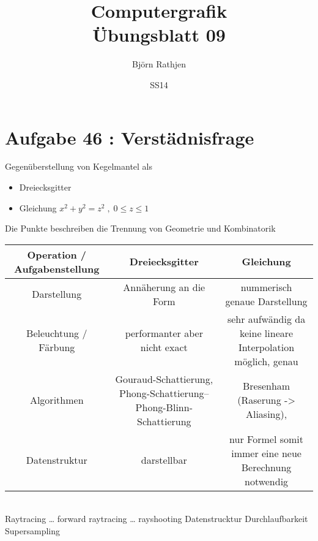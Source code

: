 \documentclass[11pt]{article}
\title{Computergrafik\\Übungsblatt 09}
\author{Björn Rathjen}
\date{SS14}
\begin{document}
\maketitle
\newpage
\section{Aufgabe 46 : Verstädnisfrage}
Gegenüberstellung von Kegelmantel als
\begin{itemize}
\item Dreiecksgitter
\item Gleichung $x^2 + y^2 = z^2 \; , \; 0\leq z \leq 1$ 
\end{itemize}
Die Punkte beschreiben die Trennung von Geometrie und Kombinatorik\\

\begin{tabular}{c|c|c}
Operation / Aufgabenstellung &
Dreiecksgitter &
Gleichung \\ \hline
 
Darstellung & 
Annäherung an die Form &
nummerisch genaue Darstellung \\ \hline 

Beleuchtung / Färbung & 
\begin{minipage}[c]{5cm} performanter aber nicht exact \end{minipage} &
\begin{minipage}[c]{5cm} sehr aufwändig da keine lineare Interpolation möglich, genau \end{minipage} \hspace{0.3cm}\\ \hline  

Algorithmen &
\hspace{0.3cm }\begin{minipage}[c]{5cm} Gouraud-Schattierung, Phong-Schattierung– Phong-Blinn-Schattierung \end{minipage}& 
Bresenham (Raserung -> Aliasing),\\ \hline \hspace{0.3cm}

Datenstruktur &
darstellbar &
nur Formel somit immer eine neue Berechnung notwendig \\

\end{tabular}\\
Raytracing … forward raytracing … rayshooting 
Datenstrucktur Durchlaufbarkeit
Supersampling \\
\end{document}
